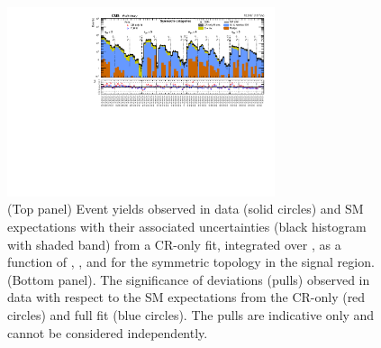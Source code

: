 \begin{figure}[!h]
  \begin{center}
    \includegraphics[angle=90,width=0.7\textwidth]{summaryPlot_Symmetric_prefit_overlay_fit_b}
    \caption{(Top panel) Event yields observed in data (solid circles)
      and SM expectations with their associated uncertainties (black
      histogram with shaded band) from a CR-only fit, integrated over
      \HTmiss, as a function of \njet, \nb, and \scalht for the
      symmetric topology in the signal region. (Bottom panel). The
      significance of deviations (pulls) observed in data with respect
      to the SM expectations from the CR-only (red circles) and full
      fit (blue circles). The pulls are indicative only and cannot be
      considered independently.}
    \label{fig:sym}
  \end{center}
\end{figure}


